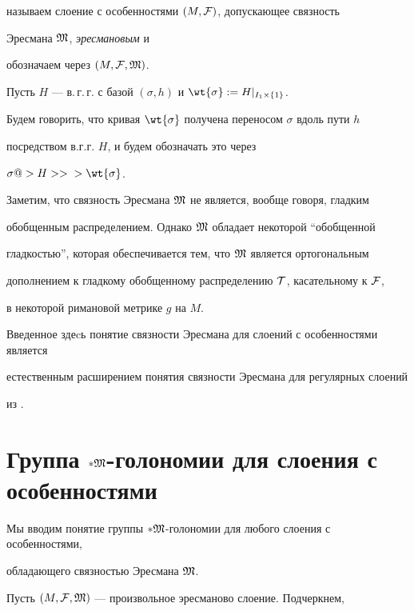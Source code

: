 называем слоение с особенностями $(M,\cal F)$, допускающее связность


Эресмана $\frak M$, {\it эресмановым} и


обозначаем через $(M,{\cal F},\frak M)$.





Пусть $H$ --- в.\,г.\,г. с базой $(\sigma, h)$ и $\wt{\sigma}:=H|_{I_1\times\{1\}}$.


Будем говорить, что кривая $\wt{\sigma}$ получена переносом $\sigma$ вдоль пути $h$


посредством в.г.г. $H$, и будем обозначать это через


$\sigma@> {H}>> {} >\wt{\sigma}$.





Заметим, что связность Эресмана $\frak M$ не является, вообще говоря, гладким


обобщенным распределением. Однако $\frak M$ обладает некоторой ``обобщенной


гладкостью'', которая обеспечивается тем, что $\frak M$ является ортогональным


дополнением к гладкому обобщенному распределению $\cal T$, касательному к $\cal F$,


в некоторой римановой метрике $g$ на $M$.





Введенное здеcь понятие связности Эресмана для слоений с особенностями является


естественным расширением понятия связности Эресмана для регулярных слоений


из \cite{BH}.








\section{Группа $*\frak M$-голономии для слоения с особенностями}





Мы вводим понятие группы $*\frak M$-голономии для любого слоения с  особенностями,


обладающего связностью Эресмана $\frak M$.





Пусть $(M,{\cal F},\frak M)$ --- произвольное эресманово слоение. Подчеркнем,


